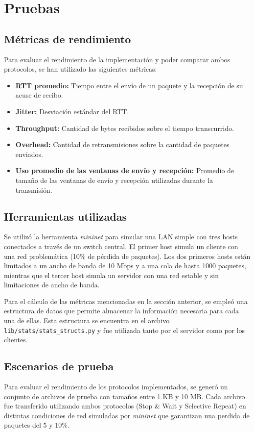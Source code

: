 \section{Pruebas}
\subsection{Métricas de rendimiento}
Para evaluar el rendimiento de la implementación y poder comparar ambos protocolos, se han utilizado las siguientes métricas:
\begin{itemize}
    \item \textbf{RTT promedio:} Tiempo entre el envío de un paquete y la recepción de su acuse de recibo.
    \item \textbf{Jitter:} Desviación estándar del RTT.
    \item \textbf{Throughput:} Cantidad de bytes recibidos sobre el tiempo transcurrido.
    \item \textbf{Overhead:} Cantidad de retransmisiones sobre la cantidad de paquetes enviados.
    \item \textbf{Uso promedio de las ventanas de envío y recepción:} Promedio de tamaño de las ventanas de envío y recepción utilizadas durante la transmisión.
\end{itemize}
\subsection{Herramientas utilizadas}
Se utilizó la herramienta \textit{mininet} para simular una LAN simple con tres hosts conectados a través de un switch central. El primer host simula un cliente con una red problemática (10\% de pérdida de paquetes). Los dos primeros hosts están limitados a un ancho de banda de 10 Mbps y a una cola de hasta 1000 paquetes, mientras que el tercer host simula un servidor con una red estable y sin limitaciones de ancho de banda.

Para el cálculo de las métricas mencionadas en la sección anterior, se empleó una estructura de datos que permite almacenar la información necesaria para cada una de ellas. Esta estructura se encuentra en el archivo \texttt{lib/stats/stats\_structs.py} y fue utilizada tanto por el servidor como por los clientes.

\subsection{Escenarios de prueba}
Para evaluar el rendimiento de los protocolos implementados, se generó un conjunto de archivos de prueba con tamaños entre 1 KB y 10 MB. Cada archivo fue transferido utilizando ambos protocolos (Stop \& Wait y Selective Repeat) en distintas condiciones de red simuladas por \textit{mininet} que garantizan una perdida de paquetes del 5 y 10\%.

